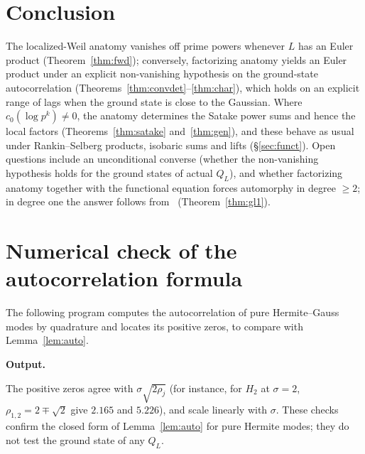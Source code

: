 \documentclass[11pt]{amsart}
\theoremstyle{definition}
\theoremstyle{remark}
\begin{document}
\section{Conclusion}
The localized-Weil anatomy vanishes off prime powers whenever $L$ has an Euler
product (Theorem~\ref{thm:fwd}); conversely, factorizing anatomy yields an Euler
product under an explicit non-vanishing hypothesis on the ground-state
autocorrelation (Theorems~\ref{thm:convdet}--\ref{thm:char}), which holds on an
explicit range of lags when the ground state is close to the Gaussian. Where
$c_0(\log p^k)\ne0$, the anatomy determines the Satake power sums and hence the
local factors (Theorems~\ref{thm:satake} and~\ref{thm:gen}), and these behave as
usual under Rankin--Selberg products, isobaric sums and lifts
(\S\ref{sec:funct}). Open questions include an unconditional converse (whether
the non-vanishing hypothesis holds for the ground states of actual $Q_L$), and
whether factorizing anatomy together with the functional equation forces
automorphy in degree $\ge2$; in degree one the answer follows from~\cite{KP1}
(Theorem~\ref{thm:gl1}).

\appendix
\section{Numerical check of the autocorrelation formula}\label{app:code}
The following program computes the autocorrelation of pure Hermite--Gauss modes
by quadrature and locates its positive zeros, to compare with
Lemma~\ref{lem:auto}.



\medskip\noindent\textbf{Output.}

The positive zeros agree with $\sigma\sqrt{2\rho_j}$ (for instance, for $H_2$ at
$\sigma=2$, $\rho_{1,2}=2\mp\sqrt2$ give $2.165$ and $5.226$), and scale
linearly with $\sigma$. These checks confirm the closed form of
Lemma~\ref{lem:auto} for pure Hermite modes; they do not test the ground state of
any $Q_L$.
\end{document}
